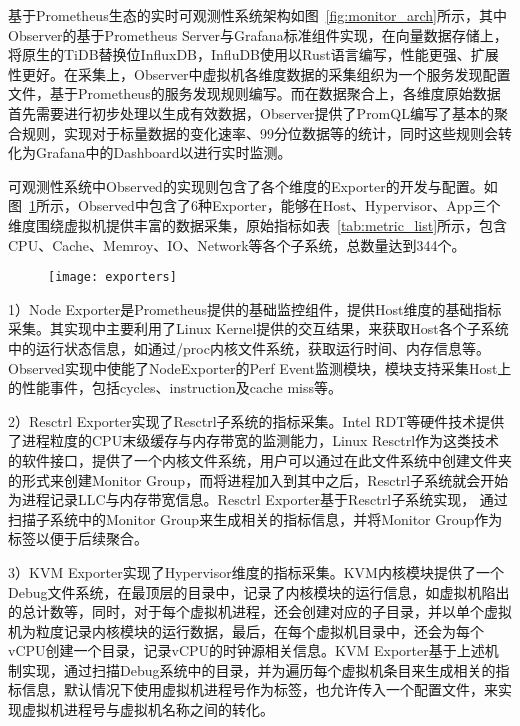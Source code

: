 基于Prometheus生态的实时可观测性系统架构如图~\ref{fig:monitor_arch}所示，其中Observer的基于Prometheus Server与Grafana标准组件实现，在向量数据存储上，将原生的TiDB替换位InfluxDB，InfluDB使用以Rust语言编写，性能更强、扩展性更好。在采集上，Observer中虚拟机各维度数据的采集组织为一个服务发现配置文件，基于Prometheus的服务发现规则编写。而在数据聚合上，各维度原始数据首先需要进行初步处理以生成有效数据，Observer提供了PromQL编写了基本的聚合规则，实现对于标量数据的变化速率、99分位数据等的统计，同时这些规则会转化为Grafana中的Dashboard以进行实时监测。

可观测性系统中Observed的实现则包含了各个维度的Exporter的开发与配置。如图~\ref{fig:exporters}所示，Observed中包含了6种Exporter，能够在Host、Hypervisor、App三个维度围绕虚拟机提供丰富的数据采集，原始指标如表~\ref{tab:metric_list}所示，包含CPU、Cache、Memroy、IO、Network等各个子系统，总数量达到344个。

\begin{figure}[!htbp]
    \centering
    \texttt{[image: exporters]}
    \label{fig:exporters} 
\end{figure}

1）Node Exporter是Prometheus提供的基础监控组件，提供Host维度的基础指标采集。其实现中主要利用了Linux Kernel提供的交互结果，来获取Host各个子系统中的运行状态信息，如通过/proc内核文件系统，获取运行时间、内存信息等。Observed实现中使能了NodeExporter的Perf Event监测模块，模块支持采集Host上的性能事件，包括cycles、instruction及cache miss等。

2）Resctrl Exporter实现了Resctrl子系统的指标采集。Intel RDT等硬件技术提供了进程粒度的CPU末级缓存与内存带宽的监测能力，Linux Resctrl作为这类技术的软件接口，提供了一个内核文件系统，用户可以通过在此文件系统中创建文件夹的形式来创建Monitor Group，而将进程加入到其中之后，Resctrl子系统就会开始为进程记录LLC与内存带宽信息。Resctrl Exporter基于Resctrl子系统实现， 通过扫描子系统中的Monitor Group来生成相关的指标信息，并将Monitor Group作为标签以便于后续聚合。

3）KVM Exporter实现了Hypervisor维度的指标采集。KVM内核模块提供了一个Debug文件系统，在最顶层的目录中，记录了内核模块的运行信息，如虚拟机陷出的总计数等，同时，对于每个虚拟机进程，还会创建对应的子目录，并以单个虚拟机为粒度记录内核模块的运行数据，最后，在每个虚拟机目录中，还会为每个vCPU创建一个目录，记录vCPU的时钟源相关信息。KVM Exporter基于上述机制实现，通过扫描Debug系统中的目录，并为遍历每个虚拟机条目来生成相关的指标信息，默认情况下使用虚拟机进程号作为标签，也允许传入一个配置文件，来实现虚拟机进程号与虚拟机名称之间的转化。

